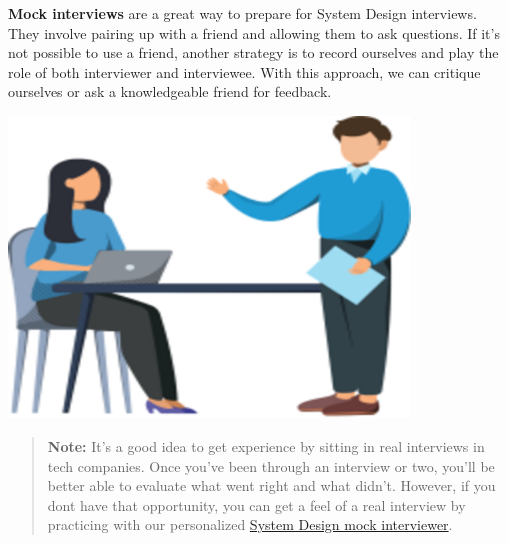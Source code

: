 \noindent
\begin{minipage}[t]{0.48\textwidth}
\textbf{Mock interviews} are a great way to prepare for System Design interviews. They involve pairing up with a friend and allowing them to ask questions. If it's not possible to use a friend, another strategy is to record ourselves and play the role of both interviewer and interviewee. With this approach, we can critique ourselves or ask a knowledgeable friend for feedback.
\end{minipage}
\hfill
\begin{minipage}[t]{0.48\textwidth}
\includegraphics[width=0.8\textwidth]{Images/chapter_1/section_5546916426809344/5008178058493952.png}
\end{minipage}

\begin{quote}
\textbf{Note:} It's a good idea to get experience by sitting in real interviews in tech companies. Once you've been through an interview or two, you'll be better able to evaluate what went right and what didn't. However, if you don\textquotesingle t have that opportunity, you can get a feel of a real interview by practicing with our personalized \href{https://www.educative.io/mock-interview}{System Design mock interviewer}.
\end{quote}

